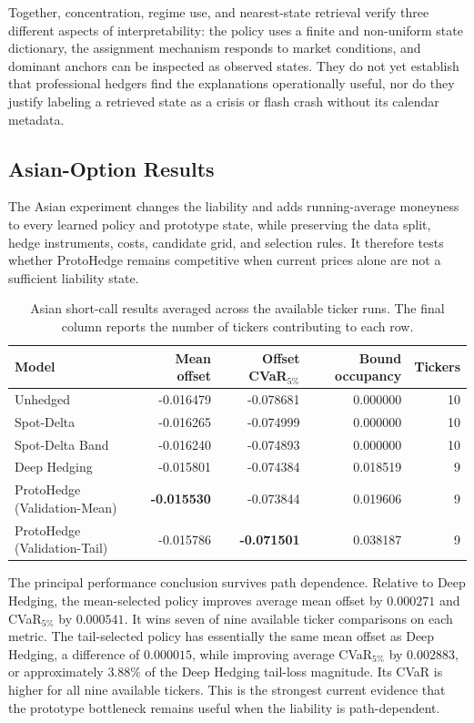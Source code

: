 \documentclass[sigconf]{acmart}
\begin{document}
Together, concentration, regime use, and nearest-state retrieval verify three
different aspects of interpretability: the policy uses a finite and non-uniform
state dictionary, the assignment mechanism responds to market conditions, and
dominant anchors can be inspected as observed states. They do not yet establish
that professional hedgers find the explanations operationally useful, nor do
they justify labeling a retrieved state as a crisis or flash crash without its
calendar metadata.

\subsection{Asian-Option Results}
\label{subsec:asian_results}

The Asian experiment changes the liability and adds running-average moneyness
to every learned policy and prototype state, while preserving the data split,
hedge instruments, costs, candidate grid, and selection rules. It therefore
tests whether ProtoHedge remains competitive when current prices alone are not
a sufficient liability state.

\begin{table}[t]
\centering
\small
\begin{tabular}{lrrrr}
\toprule
Model & Mean offset & Offset CVaR$_{5\%}$ & Bound occupancy & Tickers \\
\midrule
Unhedged & -0.016479 & -0.078681 & 0.000000 & 10 \\
Spot-Delta & -0.016265 & -0.074999 & 0.000000 & 10 \\
Spot-Delta Band & -0.016240 & -0.074893 & 0.000000 & 10 \\
Deep Hedging & -0.015801 & -0.074384 & 0.018519 & 9 \\
ProtoHedge (Validation-Mean) & \textbf{-0.015530} & -0.073844 & 0.019606 & 9 \\
ProtoHedge (Validation-Tail) & -0.015786 & \textbf{-0.071501} & 0.038187 & 9 \\
\bottomrule
\end{tabular}
\caption{Asian short-call results averaged across the available ticker runs.
The final column reports the number of tickers contributing to each row.}
\label{tab:asian-panel-average}
\end{table}

The principal performance conclusion survives path dependence. Relative to
Deep Hedging, the mean-selected policy improves average mean offset by
$0.000271$ and CVaR$_{5\%}$ by $0.000541$. It wins seven of nine available
ticker comparisons on each metric. The tail-selected policy has essentially
the same mean offset as Deep Hedging, a difference of $0.000015$, while
improving average CVaR$_{5\%}$ by $0.002883$, or approximately $3.88\%$ of the
Deep Hedging tail-loss magnitude. Its CVaR is higher for all nine available
tickers. This is the strongest current evidence that the prototype bottleneck
remains useful when the liability is path-dependent.
\end{document}
